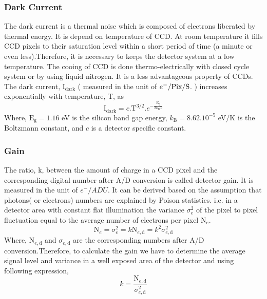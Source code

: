 \subsubsection{Dark Current}
The dark current is a thermal noise which is composed of electrons liberated by thermal energy. It is depend on temperature of CCD. At room temperature  it fills CCD pixels to their saturation level within a short period of time (a minute or even less).Therefore, it is necessary to keeps the detector system at a low temperature. The cooing of CCD is done thermo-electrically with closed cycle system or by using liquid nitrogen. It is a less advantageous property of CCDs.\\

The dark current, $ \text{I}_{\text{dark}} $ ( measured in the unit of $ e^{-}/\text{Pix/\text{S}} $. ) increases exponentially with temperature, T, as
\begin{equation}
 \text{I}_{\text{dark}}=c. \text{T}^{3/2}.e^{-{\frac{\text{E}_{\text{g}}}{2k_{\text{B}}\text{T}}}}
 \label{Equ:DarkCurrent}
\end{equation}
Where, $ \text{E}_{\text{g}}= 1.16 $ eV is the silicon band gap energy, $ k_{\text{B}}=8.62 . 10^{-5} $ eV/K is the Boltzmann constant, and $ c $ is a detector specific constant.

\subsubsection{Gain}
The ratio, k, between the amount of charge in a CCD pixel and the corresponding digital number after A/D conversion is called detector gain. It is measured in the unit of $ e^{-}/ADU $. It can be derived based on the assumption that photons( or electrons) numbers are explained by Poison statistics. i.e. in a detector area with constant flat illumination the variance $ \sigma^2_{e} $ of the pixel to pixel fluctuation equal to the average number of electrons per pixel $\text{N}_{e} $. 
\begin{equation}
\text{N}_{e}= \sigma^2_{e}= k\text{N}_{e, \text{d}}= k^2 {\sigma}^2_{e,\text{d}}
\end{equation}
Where, $\text{N}_{e, \text{d}}$ and $ \sigma_{e,\text{d}} $ are the corresponding numbers after A/D conversion.Therefore, to calculate the gain we have to determine the average signal level and variance in a well exposed area of the detector and using following expression,
\begin{equation}
k=\frac{\text{N}_{e, \text{d}}}{\sigma^2_{e,\text{d}}}
\end{equation} 

